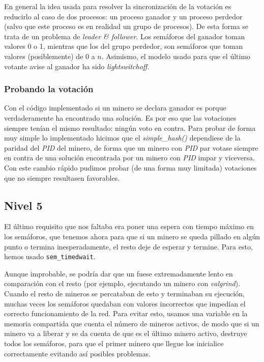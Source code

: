 \documentclass{article}
\begin{document}
En general la idea usada para resolver la sincronización de la votación es reducirlo al caso de dos procesos: un proceso ganador y un proceso perdedor (salvo que este proceso es en realidad un grupo de procesos). De esta forma se trata de un problema de \textit{leader \& follower}. Los semáforos del ganador toman valores 0 o 1, mientras que los del grupo perdedor, son semáforos que toman valores (posiblemente) de 0 a $n$. Asimismo, el modelo usado para que el último votante avise al ganador ha sido \textit{lightswitchoff}.

\subsubsection*{Probando la votación}
Con el código implementado si un minero se declara ganador es porque verdaderamente ha encontrado una solución. Es por eso que las votaciones siempre tenían el mismo resultado: ningún voto en contra. Para probar de forma muy simple lo implementado hicimos que el  \textit{simple\_hash()} dependiese de la paridad del \textit{PID} del minero, de forma que un minero con \textit{PID} par votase siempre en contra de una solución encontrada por un minero con \textit{PID} impar y viceversa. Con este cambio rápido pudimos probar (de una forma muy limitada) votaciones que no siempre resultasen favorables.


\subsection*{Nivel 5}

El último requisito que nos faltaba era poner una espera con tiempo máximo en los semáforos, que tenemos ahora para que si un minero se queda pillado en algún punto o termina inesperadamente, el resto deje de esperar y termine. Para esto, hemos usado \texttt{sem\_timedwait}. 

Aunque improbable, se podría dar que un fuese  extremadamente lento en comparación con el resto (por ejemplo, ejecutando un minero con \textit{valgrind}). Cuando el resto de mineros se percataban de esto y terminaban su ejecución, muchas veces los semáforos quedaban con valores incorrectos que impedían el correcto funcionamiento de la red. Para evitar esto, usamos una variable en la memoria compartida que cuenta el número de mineros activos, de modo que si un minero va a liberar y se da cuenta de que es el último minero activo, destruye todos los semáforos, para que el primer minero que llegue los inicialice correctamente evitando así posibles problemas.
\end{document}
